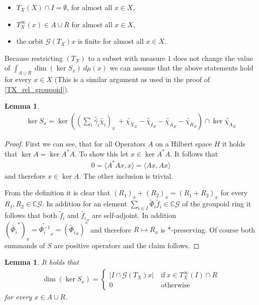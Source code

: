 \documentclass[12pt,a4paper]{scrartcl}
\theoremstyle{plain}
\newtheorem{Lemma}[Theorem]{Lemma}
\theoremstyle{definition}
\numberwithin{equation}{section}
\newcommand{\C}{\mathbb{C}} %
\newcommand{\2}{\mathbb{Z} / 2 \mathbb{Z}}
\newcommand{\G}{\mathcal{G}}
\newcommand{\1}{\bar{1}}
\newcommand{\0}{\bar{0}}
\begin{document}
\begin{itemize}
	\item $T_X(X) \cap I= \emptyset$, for almost all $x \in X$,
	\item $T_X^\infty(x) \in A \cup R$ for almost all $x \in X$,
	\item the orbit $\G (T_X)x$ is finite for almost all $x \in X$.
\end{itemize}
Because restricting $(T_X)$ to a subset with measure $1$ does not change the value of $\int_{A \cup R} \dim (\ker S_x) \ d \mu (x)$ we can assume that the above statements hold for every $x \in X$ (This is a similar argument as used in the proof of \ref{TX_rel_groupoid}).
\begin{Lemma}
	\begin{align*}
	\ker S_x = \ker((\sum_{i} \tilde{\bar{\gamma_i}} \tilde{\chi_i})_x \ + \tilde{\chi_X}_x - \tilde{\chi_I}_x - \tilde{\chi_A}_x - \tilde{\chi_R}_x) \cap \ker \tilde{\chi_A}_x
	\end{align*}
\end{Lemma}
\begin{proof}
	First we can see, that for all Operators $A$ on a Hilbert space $H$ it holds that $\ker A = \ker A^*A$. To show this let $x \in \ker A^*A$. It follows that
	\begin{align*}
		0 = \langle A^*Ax, x \rangle = \langle Ax, Ax \rangle
	\end{align*}
	and therefore $x \in \ker A$. The other inclusion is trivial. 
	
	From the definition it is clear that $(R_1)_x + (R_2)_x = (R_1 + R_2)_x$ for every $R_1, R_2 \in \C \G$. In addition for an element $\sum_{i \in I} \tilde \Phi_i\tilde f_i \in \C\G$ of the  groupoid ring it follows that both $\tilde f_i$ and $\tilde {f_i}_x$ are self-adjoint. In addition $(\widetilde {\Phi_i}^*)_x = \widetilde {\Phi_i^{-1}}_x = (\widetilde {\Phi_i}_x)^*$  and therefore $R \mapsto R_x$ is $*$-preserving. Of course both summands of $S$ are positive operators and the claim follows.
\end{proof}
\begin{Lemma} \label{kerSx_berechnen}
	It holds that
	\begin{align*}
		\dim (\ker S_x) = \begin{cases}
		|I \cap \G (T_X)x| &~ \text{if} ~ x \in T_X^\infty(I) \cap R\\
		0 &~ \text{otherwise} 
		\end{cases}
	\end{align*}
	for every $x \in A \cup R$.
\end{Lemma}
\end{document}
